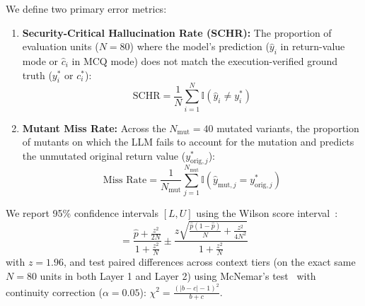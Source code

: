 \documentclass[runningheads]{llncs}
\begin{document}
We define two primary error metrics:
\begin{enumerate}
    \item \textbf{Security-Critical Hallucination Rate (SCHR):} The proportion of evaluation units ($N=80$) where the model's prediction ($\hat{y}_i$ in return-value mode or $\hat{c}_i$ in MCQ mode) does not match the execution-verified ground truth ($y_i^*$ or $c_i^*$):
    \begin{equation}
    \text{SCHR} = \frac{1}{N} \sum_{i=1}^N \mathbb{I}\left( \hat{y}_i \neq y_i^* \right)
    \end{equation}
    \item \textbf{Mutant Miss Rate:} Across the $N_{\text{mut}} = 40$ mutated variants, the proportion of mutants on which the LLM fails to account for the mutation and predicts the unmutated original return value ($y_{\text{orig}, j}^*$):
    \begin{equation}
    \text{Miss Rate} = \frac{1}{N_{\text{mut}}} \sum_{j=1}^{N_{\text{mut}}} \mathbb{I}\left( \hat{y}_{\text{mut}, j} = y_{\text{orig}, j}^* \right)
    \end{equation}
\end{enumerate}
We report 95\% confidence intervals $[L, U]$ using the Wilson score interval~\cite{wilson1927probable}:
\begin{equation}
[L, U] = \frac{\hat{p} + \frac{z^2}{2N}}{1 + \frac{z^2}{N}} \pm \frac{z \sqrt{\frac{\hat{p}(1-\hat{p})}{N} + \frac{z^2}{4N^2}}}{1 + \frac{z^2}{N}}
\end{equation}
with $z = 1.96$, and test paired differences across context tiers (on the exact same $N=80$ units in both Layer 1 and Layer 2) using McNemar's test~\cite{mcnemar1947note} with continuity correction ($\alpha = 0.05$): $\chi^2 = \frac{(|b - c| - 1)^2}{b + c}$.
\end{document}
